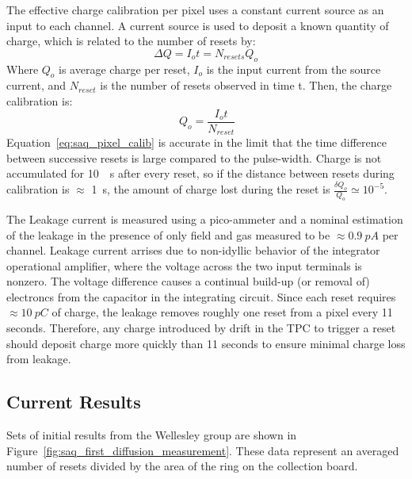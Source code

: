 The effective charge calibration per pixel uses a constant current source as an input to each channel.
A current source is used to deposit a known quantity of charge, which is related to the number of resets by:
\begin{equation}
 \Delta Q = I_{o}t = N_{resets}Q_{o}
\end{equation}
Where $Q_{o}$ is average charge per reset, $I_{o}$ is the input current from the source current, and $N_{reset}$ is the number of resets observed in time t.
Then, the charge calibration is:
\begin{equation}~\label{eq:saq_pixel_calib}
 Q_{o} = \frac{I_{o}t}{N_{reset}}
\end{equation}
Equation~\ref{eq:saq_pixel_calib} is accurate in the limit that the time difference between successive resets is large compared to the pulse-width.
Charge is not accumulated for 10~\unit{\mu s} after every reset, so if the distance between resets during calibration is $\approx$ 1~\unit{s}, the amount of charge lost during the reset is $\frac{\delta Q_{o}}{Q_{o}} \simeq 10^{-5}$.

The Leakage current is measured using a pico-ammeter and a nominal estimation of the leakage in the presence of only field and gas measured to be $\approx 0.9~\unit{pA}$ per channel.
Leakage current arrises due to non-idyllic behavior of the integrator operational amplifier, where the voltage across the two input terminals is nonzero.
The voltage difference causes a continual build-up (or removal of) electroncs from the capacitor in the integrating circuit.
Since each reset requires $\approx 10~\unit{pC}$ of charge, the leakage removes roughly one reset from a pixel every 11 seconds.
Therefore, any charge introduced by drift in the TPC to trigger a reset should deposit charge more quickly than 11 seconds to ensure minimal charge loss from leakage.


\subsection{Current Results}


Sets of initial results from the Wellesley group are shown in Figure~\ref{fig:saq_first_diffusion_measurement}.
These data represent an averaged number of resets divided by the area of the ring on the collection board.

